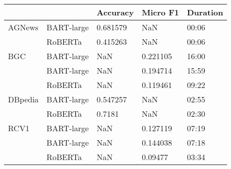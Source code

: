 \begin{tabular}{lllll}
\toprule
     &         &  Accuracy &  Micro F1 & Duration \\
\midrule
AGNews & BART-large &  0.681579 &       NaN &    00:06 \\
     & RoBERTa &  0.415263 &       NaN &    00:06 \\
BGC & BART-large &       NaN &  0.221105 &    16:00 \\
     & BART-large &       NaN &  0.194714 &    15:59 \\
     & RoBERTa &       NaN &  0.119461 &    09:22 \\
DBpedia & BART-large &  0.547257 &       NaN &    02:55 \\
     & RoBERTa &    0.7181 &       NaN &    02:30 \\
RCV1 & BART-large &       NaN &  0.127119 &    07:19 \\
     & BART-large &       NaN &  0.144038 &    07:18 \\
     & RoBERTa &       NaN &   0.09477 &    03:34 \\
\bottomrule
\end{tabular}
